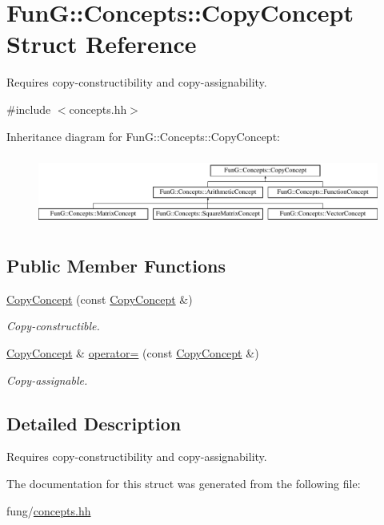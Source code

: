 \hypertarget{structFunG_1_1Concepts_1_1CopyConcept}{\section{Fun\-G\-:\-:Concepts\-:\-:Copy\-Concept Struct Reference}
\label{structFunG_1_1Concepts_1_1CopyConcept}
}


Requires copy-\/constructibility and copy-\/assignability.  




{\ttfamily \#include $<$concepts.\-hh$>$}

Inheritance diagram for Fun\-G\-:\-:Concepts\-:\-:Copy\-Concept\-:\begin{figure}[H]
\begin{center}
\leavevmode
\includegraphics[height=2.352941cm]{structFunG_1_1Concepts_1_1CopyConcept}
\end{center}
\end{figure}
\subsection*{Public Member Functions}
\begin{DoxyCompactItemize}
\item 
\hypertarget{structFunG_1_1Concepts_1_1CopyConcept_afc08741d422ff46c2e681efc38913144}{\hyperlink{structFunG_1_1Concepts_1_1CopyConcept_afc08741d422ff46c2e681efc38913144}{Copy\-Concept} (const \hyperlink{structFunG_1_1Concepts_1_1CopyConcept}{Copy\-Concept} \&)}\label{structFunG_1_1Concepts_1_1CopyConcept_afc08741d422ff46c2e681efc38913144}

\begin{DoxyCompactList}\small\item\em Copy-\/constructible. \end{DoxyCompactList}\item 
\hypertarget{structFunG_1_1Concepts_1_1CopyConcept_a43c6c112f8164497a4279458af2c0b20}{\hyperlink{structFunG_1_1Concepts_1_1CopyConcept}{Copy\-Concept} \& \hyperlink{structFunG_1_1Concepts_1_1CopyConcept_a43c6c112f8164497a4279458af2c0b20}{operator=} (const \hyperlink{structFunG_1_1Concepts_1_1CopyConcept}{Copy\-Concept} \&)}\label{structFunG_1_1Concepts_1_1CopyConcept_a43c6c112f8164497a4279458af2c0b20}

\begin{DoxyCompactList}\small\item\em Copy-\/assignable. \end{DoxyCompactList}\end{DoxyCompactItemize}


\subsection{Detailed Description}
Requires copy-\/constructibility and copy-\/assignability. 

The documentation for this struct was generated from the following file\-:\begin{DoxyCompactItemize}
\item 
fung/\hyperlink{concepts_8hh}{concepts.\-hh}\end{DoxyCompactItemize}
